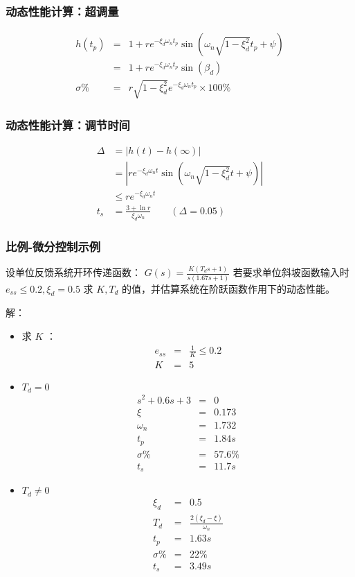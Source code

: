 \documentclass{article}
\begin{document}
\begin{frame}
\frametitle{动态性能计算：超调量}
\label{sec-4-2-6}

\begin{eqnarray*}
h(t_p) & =& 1+re^{-\xi_d\omega_n t_p}\sin(\omega_n\sqrt{1-\xi_d^2}t_p+\psi) \\
 &=& 1+re^{-\xi_d\omega_n t_p}\sin(\beta_d) \\
\sigma\% &=& r\sqrt{1-\xi_d^2}e^{-\xi_d\omega_n t_p} \times 100\%
\end{eqnarray*}
\end{frame}
\begin{frame}
\frametitle{动态性能计算：调节时间}
\label{sec-4-2-7}

\begin{align*}
\Delta  &= |h(t)-h(\infty)|\\
&= |re^{-\xi_d\omega_n t}\sin(\omega_n\sqrt{1-\xi_d^2}t+\psi) |\\
&\leqslant re^{-\xi_d\omega_n t} \\
t_s &= \frac{3+\ln r}{\xi_d \omega_n}\qquad (\Delta=0.05)
\end{align*}
\end{frame}
\begin{frame}
\frametitle{比例-微分控制示例}
\label{sec-4-2-8}

设单位反馈系统开环传递函数： $G(s)=\frac{K(T_d s+1)}{s(1.67s+1)}$
若要求单位斜坡函数输入时 $e_{ss}\leq 0.2, \xi_d=0.5$ 求
$K,T_d$ 的值，并估算系统在阶跃函数作用下的动态性能。

解：
\begin{itemize}

\item 求 $K$ ：
\label{sec-4-2-8-1}%
\begin{eqnarray*}
e_{ss} & =& \frac{1}{K} \leq 0.2\\
 K &=& 5 
\end{eqnarray*}

\item $T_d=0$
\label{sec-4-2-8-2}%
\begin{eqnarray*}
s^2+0.6s+3 & =& 0\\
\xi &=& 0.173 \\
\omega_n &=& 1.732 \\
t_p &=& 1.84s \\
\sigma\% &=& 57.6\% \\
t_s &=& 11.7s
\end{eqnarray*}


\item $T_d\neq0$
\label{sec-4-2-8-3}%
\begin{eqnarray*}
\xi_d & =& 0.5\\
T_d &=& \frac{2(\xi_d-\xi)}{\omega_n}\\
t_p &=& 1.63s \\
\sigma\% &=& 22\% \\
t_s &=& 3.49s
\end{eqnarray*}
\end{itemize} %
\end{frame}
\end{document}
